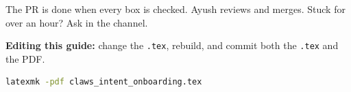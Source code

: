 \documentclass[11pt]{article}
\begin{document}
The PR is done when every box is checked. Ayush reviews and merges. Stuck for
over an hour? Ask in the channel.

\textbf{Editing this guide:} change the \texttt{.tex}, rebuild, and commit
both the \texttt{.tex} and the PDF.
\begin{lstlisting}[language=bash]
latexmk -pdf claws_intent_onboarding.tex
\end{lstlisting}
\end{document}
